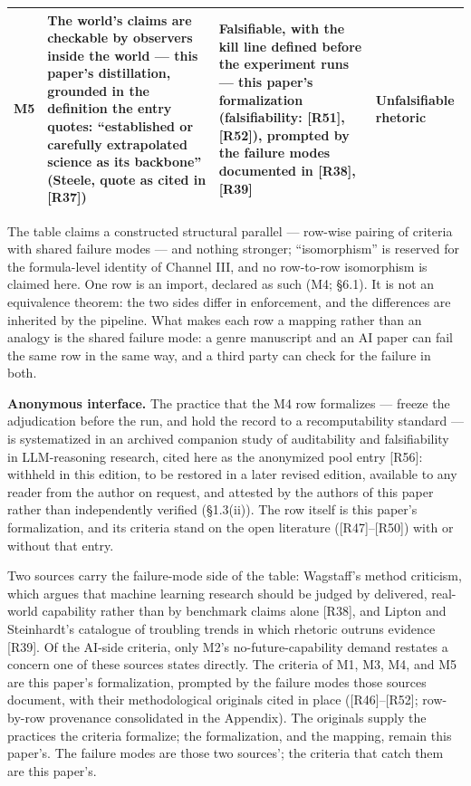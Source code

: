 \documentclass[11pt,a4paper]{article}
\begin{document}
\begin{table}[htbp]
\begin{tabularx}{0.985\textwidth}{@{}>{\raggedright\arraybackslash}p{}>{\raggedright\arraybackslash}X>{\raggedright\arraybackslash}X>{\raggedright\arraybackslash}p{}@{}}
M5 & The world's claims are checkable by observers inside the world — this paper's distillation, grounded in the definition the entry quotes: ``established or carefully extrapolated science as its backbone'' (Steele, quote as cited in [R37]) & Falsifiable, with the kill line defined before the experiment runs — this paper's formalization (falsifiability: [R51], [R52]), prompted by the failure modes documented in [R38], [R39] & Unfalsifiable rhetoric \\
\bottomrule
\end{tabularx}
\end{table}

The table claims a constructed structural parallel — row-wise pairing of criteria with shared failure modes — and nothing stronger; ``isomorphism'' is reserved for the formula-level identity of Channel III, and no row-to-row isomorphism is claimed here. One row is an import, declared as such (M4; §6.1). It is not an equivalence theorem: the two sides differ in enforcement, and the differences are inherited by the pipeline. What makes each row a mapping rather than an analogy is the shared failure mode: a genre manuscript and an AI paper can fail the same row in the same way, and a third party can check for the failure in both.

\textbf{Anonymous interface.} The practice that the M4 row formalizes — freeze the adjudication before the run, and hold the record to a recomputability standard — is systematized in an archived companion study of auditability and falsifiability in LLM-reasoning research, cited here as the anonymized pool entry [R56]: withheld in this edition, to be restored in a later revised edition, available to any reader from the author on request, and attested by the authors of this paper rather than independently verified (§1.3(ii)). The row itself is this paper's formalization, and its criteria stand on the open literature ([R47]–[R50]) with or without that entry.

Two sources carry the failure-mode side of the table: Wagstaff's method criticism, which argues that machine learning research should be judged by delivered, real-world capability rather than by benchmark claims alone [R38], and Lipton and Steinhardt's catalogue of troubling trends in which rhetoric outruns evidence [R39]. Of the AI-side criteria, only M2's no-future-capability demand restates a concern one of these sources states directly. The criteria of M1, M3, M4, and M5 are this paper's formalization, prompted by the failure modes those sources document, with their methodological originals cited in place ([R46]–[R52]; row-by-row provenance consolidated in the Appendix). The originals supply the practices the criteria formalize; the formalization, and the mapping, remain this paper's. The failure modes are those two sources'; the criteria that catch them are this paper's.
\end{document}
